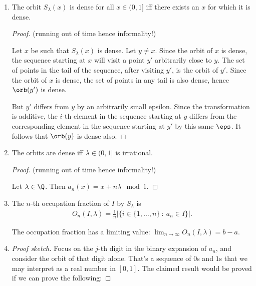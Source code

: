 \begin{enumerate}[label=(5.\arabic*)]

\item
  \begin{claim*}
    The orbit $S_{\lambda}(x)$ is dense for all $x \in (0, 1]$ iff there exists an $x$ for which it is dense.
  \end{claim*}
  \begin{proof}
    (running out of time hence informality!)

    Let $x$ be such that $S_\lambda(x)$ is dense. Let $y \neq x$. Since the orbit of $x$ is dense, the sequence
    starting at $x$ will visit a point $y'$ arbitrarily close to $y$. The set of points in the tail of the
    sequence, after visiting $y'$, is the orbit of $y'$. Since the orbit of $x$ is dense, the set of points in
    any tail is also dense, hence $\orb(y')$ is dense.

    But $y'$ differs from $y$ by an arbitrarily small epsilon. Since the transformation is additive, the $i$-th
    element in the sequence starting at $y$ differs from the corresponding element in the sequence starting
    at $y'$ by this same $\eps$. It follows that $\orb(y)$ is dense also.
  \end{proof}

\item
  \begin{claim*}
    The orbits are dense iff $\lambda \in (0, 1]$ is irrational.
  \end{claim*}
  \begin{proof}
    (running out of time hence informality!)

    Let $\lambda \in \Q$. Then $a_n(x) = x + n\lambda \mod 1$.

  \end{proof}
\item
  \begin{definition*}
    The $n$-th occupation fraction of $I$ by $S_\lambda$ is
    \begin{align*}
      O_n(I, \lambda) = \frac{1}{n}\Big|\Big\{i \in \{1, \ldots, n\} ~:~ a_n \in I\Big\}\Big|.
    \end{align*}
  \end{definition*}
  \begin{claim*}
    The occupation fraction has a limiting value: $\lim_{n\to\infty}O_n(I, \lambda) = b - a$.
  \end{claim*}
\item

  \begin{proof}[Proof sketch]
    Focus on the $j$-th digit in the binary expansion of $a_n$, and consider the orbit of that digit alone.
    That's a sequence of $0$s and $1$s that we may interpret as a real number in $[0, 1]$. The claimed result
    would be proved if we can prove the following:


\end{proof}
\end{enumerate}
